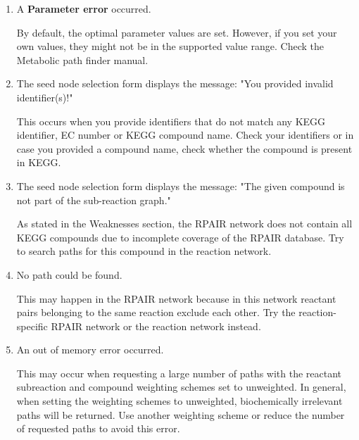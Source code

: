 \begin{enumerate}

\item A \textbf{Parameter error} occurred.

	By default, the optimal parameter values are set. However, if you set your own values, they might not
	be in the supported value range. Check the Metabolic path finder manual.

\item The seed node selection form displays the message: "You provided invalid identifier(s)!"

     This occurs when you provide identifiers that do not match any KEGG identifier, EC number or KEGG
     compound name. Check your identifiers or in case you provided a compound name, check whether the
     compound is present in KEGG.

\item The seed node selection form displays the message: "The given compound is not part of the sub-reaction graph."

     As stated in the Weaknesses section, the RPAIR network does not contain all KEGG compounds due to incomplete
     coverage of the RPAIR database. Try to search paths for this compound in the reaction network.

\item No path could be found.

	This may happen in the RPAIR network because in this network reactant pairs belonging to the same reaction
	exclude each other. Try the reaction-specific RPAIR network or the reaction network instead.

\item An out of memory error occurred.

 	This may occur when requesting a large number of paths with the reactant subreaction and compound weighting schemes
 	set to unweighted. In general, when setting the weighting schemes to unweighted, biochemically irrelevant paths
 	will be returned. Use another weighting scheme or reduce the number of requested paths to avoid this error.

\end{enumerate}







